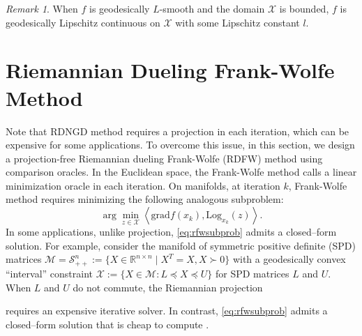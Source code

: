 \documentclass{article}
\newcommand{\rgrad}{\mathrm{grad}}
\newcommand{\Log}{\mathrm{Log}}
\theoremstyle{plain}
\theoremstyle{definition}
\theoremstyle{remark}
\newtheorem{remark}[theorem]{Remark}
\begin{document}
\begin{remark}
When $f$ is geodesically $L$-smooth and the domain $\mathcal{X}$ is bounded, $f$ is geodesically Lipschitz continuous on $\mathcal{X}$ with some Lipschitz constant $l$.
\end{remark}
\fi
\section{Riemannian Dueling Frank-Wolfe Method}
Note that RDNGD method requires a projection in each iteration, which can be expensive for some applications. To overcome this issue, in this section, we design a projection-free Riemannian dueling Frank-Wolfe (RDFW) method using comparison oracles. In the Euclidean space, the Frank-Wolfe method calls a linear minimization oracle in each iteration. On manifolds, at iteration $k$, Frank-Wolfe method requires minimizing the following analogous subproblem:
\begin{equation}\label{eq:rfwsubprob}
 \arg\min_{z\in\mathcal{X}} \left\langle \rgrad f(x_k), \Log_{x_k}(z)\right\rangle.
\end{equation}
In some applications, unlike projection, \eqref{eq:rfwsubprob} admits a closed–form solution. %
For example, consider the manifold of symmetric positive definite (SPD) matrices $\mathcal{M}=\mathcal{S}_{++}^n:=\{X\in\mathbb{R}^{n\times n}\mid X^T=X, X\succ 0\}$ with a geodesically convex ``interval'' constraint
$\mathcal{X} := \{ X \in \mathcal{M} : L \preceq X \preceq U \}$ for SPD matrices $L$ and $U$. When $L$ and $U$ do not commute, the Riemannian projection 

requires an expensive iterative solver. In contrast, \eqref{eq:rfwsubprob} admits a closed–form solution that is cheap to compute \citep{RFW}.
\end{document}
